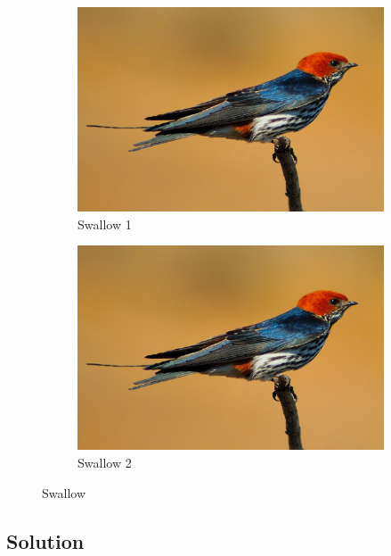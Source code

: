 \documentclass[
  UTF8, %
  12pt, %
]{assigment}
\begin{document}
\begin{figure}[H]
  \centering
  \begin{subfigure}[b]{0.4\textwidth}
    \includegraphics[width=\textwidth]{swallow.jpg}
    \caption{Swallow 1}
    \label{fig:swallow_1}
  \end{subfigure} \quad
  \begin{subfigure}[b]{0.4\textwidth}
    \includegraphics[width=\textwidth]{swallow.jpg}
    \caption{Swallow 2}
    \label{fig:swallow_2}
  \end{subfigure}
  \caption{Swallow}
  \label{fig:swallow_all}
\end{figure}


\subsection*{Solution}
\end{document}
